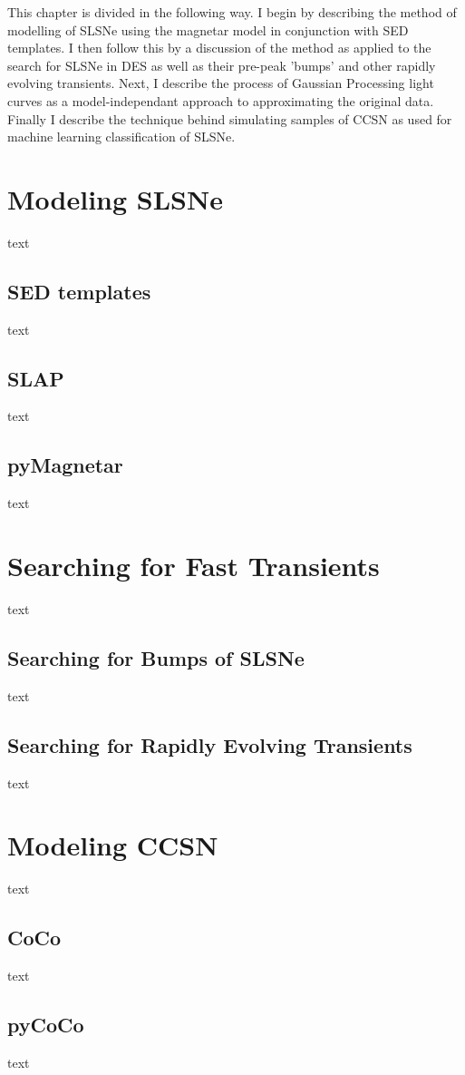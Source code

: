 This chapter is divided in the following way. I begin by describing the method of modelling of SLSNe using the magnetar model in conjunction with SED templates. I then follow this by a discussion of the method as applied to the search for SLSNe in DES as well as their pre-peak 'bumps' and other rapidly evolving transients. Next, I describe the process of Gaussian Processing light curves as a model-independant approach to approximating the original data. Finally I describe the technique behind simulating samples of CCSN as used for machine learning classification of SLSNe.

\section{Modeling SLSNe} \label{sec:SLAP}
text
\subsection{SED templates}
text
\subsection{SLAP}
text
\subsection{pyMagnetar}
text

\section{Searching for Fast Transients}
text
\subsection{Searching for Bumps of SLSNe}
text
\subsection{Searching for Rapidly Evolving Transients}
text

\section{Modeling CCSN}
text
\subsection{CoCo}
text
\subsection{pyCoCo}
text
